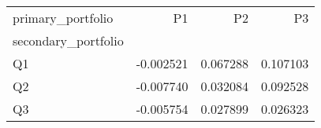 \begin{tabular}{lrrr}
\toprule
primary_portfolio & P1 & P2 & P3 \\
secondary_portfolio &  &  &  \\
\midrule
Q1 & -0.002521 & 0.067288 & 0.107103 \\
Q2 & -0.007740 & 0.032084 & 0.092528 \\
Q3 & -0.005754 & 0.027899 & 0.026323 \\
\bottomrule
\end{tabular}
